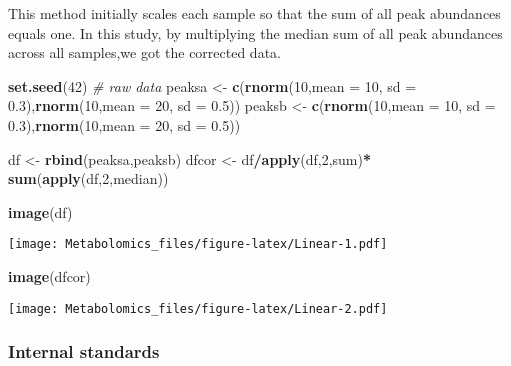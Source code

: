 \documentclass[
]{book}
\newenvironment{Shaded}{\begin{snugshade}}{\end{snugshade}}
\newcommand{\CommentTok}[1]{\textcolor[rgb]{0.56,0.35,0.01}{\textit{#1}}}
\newcommand{\DataTypeTok}[1]{\textcolor[rgb]{0.13,0.29,0.53}{#1}}
\newcommand{\DecValTok}[1]{\textcolor[rgb]{0.00,0.00,0.81}{#1}}
\newcommand{\FloatTok}[1]{\textcolor[rgb]{0.00,0.00,0.81}{#1}}
\newcommand{\KeywordTok}[1]{\textcolor[rgb]{0.13,0.29,0.53}{\textbf{#1}}}
\newcommand{\NormalTok}[1]{#1}
\newcommand{\OperatorTok}[1]{\textcolor[rgb]{0.81,0.36,0.00}{\textbf{#1}}}
\newcommand{\StringTok}[1]{\textcolor[rgb]{0.31,0.60,0.02}{#1}}
\begin{document}
This method initially scales each sample so that the sum of all
peak abundances equals one. In this study, by multiplying the median sum of all peak abundances across all samples,we got the corrected data.

\begin{Shaded}
\begin{Highlighting}[]
\KeywordTok{set.seed}\NormalTok{(}\DecValTok{42}\NormalTok{)}
\CommentTok{# raw data}
\NormalTok{peaksa <-}\StringTok{ }\KeywordTok{c}\NormalTok{(}\KeywordTok{rnorm}\NormalTok{(}\DecValTok{10}\NormalTok{,}\DataTypeTok{mean =} \DecValTok{10}\NormalTok{, }\DataTypeTok{sd =} \FloatTok{0.3}\NormalTok{),}\KeywordTok{rnorm}\NormalTok{(}\DecValTok{10}\NormalTok{,}\DataTypeTok{mean =} \DecValTok{20}\NormalTok{, }\DataTypeTok{sd =} \FloatTok{0.5}\NormalTok{))}
\NormalTok{peaksb <-}\StringTok{ }\KeywordTok{c}\NormalTok{(}\KeywordTok{rnorm}\NormalTok{(}\DecValTok{10}\NormalTok{,}\DataTypeTok{mean =} \DecValTok{10}\NormalTok{, }\DataTypeTok{sd =} \FloatTok{0.3}\NormalTok{),}\KeywordTok{rnorm}\NormalTok{(}\DecValTok{10}\NormalTok{,}\DataTypeTok{mean =} \DecValTok{20}\NormalTok{, }\DataTypeTok{sd =} \FloatTok{0.5}\NormalTok{))}

\NormalTok{df <-}\StringTok{ }\KeywordTok{rbind}\NormalTok{(peaksa,peaksb)}
\NormalTok{dfcor <-}\StringTok{ }\NormalTok{df}\OperatorTok{/}\KeywordTok{apply}\NormalTok{(df,}\DecValTok{2}\NormalTok{,sum)}\OperatorTok{*}\StringTok{ }\KeywordTok{sum}\NormalTok{(}\KeywordTok{apply}\NormalTok{(df,}\DecValTok{2}\NormalTok{,median))}

\KeywordTok{image}\NormalTok{(df)}
\end{Highlighting}
\end{Shaded}

\texttt{[image: Metabolomics\_files/figure-latex/Linear-1.pdf]}

\begin{Shaded}
\begin{Highlighting}[]
\KeywordTok{image}\NormalTok{(dfcor)}
\end{Highlighting}
\end{Shaded}

\texttt{[image: Metabolomics\_files/figure-latex/Linear-2.pdf]}

\hypertarget{internal-standards}{%
\subsubsection{Internal standards}\label{internal-standards}}
\end{document}
